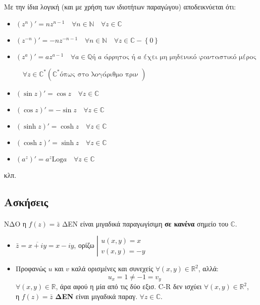 \documentclass[12pt,a4paper,notitlepage,fleqn]{article}
\begin{document}
	 Με την ίδια λογική (και με χρήση των ιδιοτήτων παραγώγου) αποδεικνύεται ότι:
	 \begin{itemize}
	 	\item \( (z^n)' =nz^{n-1}\quad \forall n\in\mathbb N \quad \forall z\in\mathbb C \)
	 	\item \(
	 	(z^{-n})' = -nz^{-n-1}\quad\forall n\in\mathbb N \quad\forall z\in
	 	\mathbb C - \left\lbrace 0 \right\rbrace
	 	 \)
	    \item \(
	    (z^a)'=az^{a-1}\quad\forall a\in\mathbb Q \text{
	    	ή $a$ άρρητος ή $a$ έχει μη μηδενικό φανταστικό μέρος
	    	}
	     \)
	     
	     \( \quad \forall z\in\mathbb C^* (\mathbb C^* \text{
	     	όπως στο λογάριθμο πριν
	     }) \)
	    \item \( (\sin z)'=\cos z\quad\forall z\in\mathbb C  \)
	    \item \( (\cos z)'=-\sin z \quad\forall z\in\mathbb C  \)
	    \item \( (\sinh z)' = \cosh z\quad\forall z\in\mathbb C \)
	    \item \( (\cosh z)' = \sinh z\quad\forall z\in\mathbb C \)
	    \item \( (a^z)'=a^z\mathrm{Log}a\quad\forall z\in\mathbb C \)
	 \end{itemize}
	 κλπ.

	 \subsection{Ασκήσεις}
	 \paragraph{} ΝΔΟ
	 η \( f(z)=\bar z \) ΔΕΝ είναι μιγαδικά παραγωγίσιμη \textbf{σε κανένα}
	 σημείο του \( \mathbb C \).

	 \begin{itemize}
	 	\item \( \bar z = \overline{x+iy}=x-iy \), ορίζω
	 	\( \left| \begin{array}{l}
	 	u(x,y) = x \\ v(x,y) = -y
	 	\end{array} \right. \)
	 	\item Προφανώς \( u \) και \( v \) καλά ορισμένες και συνεχείς
	 	\( \forall (x,y)\in\mathbb R^2 \), αλλά:
	 	\[
	 	u_x=1\neq -1 = v_y
	 	\]
	 	\( \forall(x,y)\in \mathbb R \), άρα αφού η μία από τις δύο εξισ.
	 	C-R δεν ισχύει \underline{\( \forall(x,y)\in\mathbb R^2 \)},
	 	η \( f(z)=\bar z \) \textbf{ΔΕΝ} είναι μιγαδικά παραγ.
	 	\( \forall z\in\mathbb C \).
	 \end{itemize}
\end{document}
